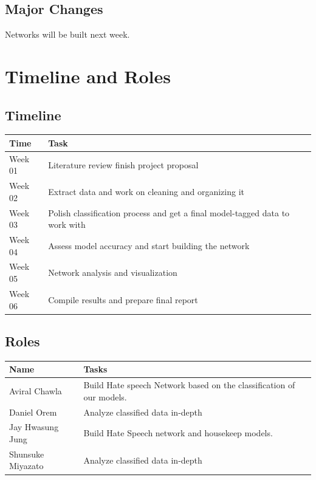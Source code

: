 \documentclass{article}
\begin{document}
\begin{multicols}{2}
    \subsection{Major Changes}
        \hspace{5mm}Networks will be built next week. 
\section{Timeline and Roles}
    \subsection{Timeline}
        \begin{tabular}{m{3.8em} | m{19em}} 
        \hline
        Time & Task \\ [0.5ex] 
        \hline\hline
        \small Week 01 & Literature review finish project proposal \\ 
        \hline
        \small Week 02 & Extract data and work on cleaning and organizing it \\
        \hline
        \small Week 03 & Polish classification process and get a final model-tagged data to work with \\
        \hline
        \small Week 04 & Assess model accuracy and start building the network \\
        \hline
        \small Week 05 & Network analysis and visualization \\
        \hline
        \small Week 06 & Compile results and prepare final report \\
        \end{tabular}
    \subsection{Roles}
        \begin{tabular}{m{7.8em} | m{15em}} 
        \hline
        Name & Tasks \\ [0.5ex] 
        \hline\hline
        \small Aviral Chawla & Build Hate speech Network based on the classification of our models. \\ 
        \hline
        \small Daniel Orem & Analyze classified data in-depth\\
        \hline
        \small Jay Hwasung Jung & Build Hate Speech network and housekeep models.  \\
        \hline
        \small Shunsuke Miyazato & Analyze classified data in-depth\\
        \end{tabular}
\end{multicols}
\end{document}
